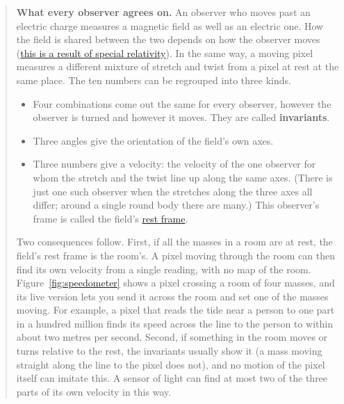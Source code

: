 \begin{quote}
\textbf{What every observer agrees on.} An observer who moves past an electric
charge measures a magnetic field as well as an electric one. How the field is
shared between the two depends on how the observer moves
(\href{https://en.wikipedia.org/wiki/Classical_electromagnetism_and_special_relativity}{this
is a result of special relativity}). In the same way, a moving pixel measures a
different mixture of stretch and twist from a pixel at rest at the same place.
The ten numbers can be regrouped into three kinds.
\begin{itemize}
\item Four combinations come out the same for every observer, however the
observer is turned and however it moves. They are called \textbf{invariants}.
\item Three angles give the orientation of the field's own axes.
\item Three numbers give a velocity: the velocity of the one observer for whom
the stretch and the twist line up along the same axes. (There is just one such
observer when the stretches along the three axes all differ; around a single
round body there are many.) This observer's frame is
called the field's
\href{https://en.wikipedia.org/wiki/Rest_frame}{rest frame}.
\end{itemize}
Two consequences follow. First, if all the masses in a room are at rest, the
field's rest frame is the room's. A pixel moving through the room can then find
its own velocity from a single reading, with no map of the room. Figure~\ref{fig:speedometer} shows a pixel crossing a room of four masses, and its live version lets you send it across the room and set one of the masses moving. For example, a
pixel that reads the tide near a person to one part in a hundred million finds
its speed across the line to the person to within about two metres per second.
Second, if something in the room moves or turns relative to the rest, the
invariants usually show it (a mass moving straight along the line to the pixel
does not), and no motion of the pixel itself can imitate this. A sensor of light can find at most two of
the three parts of its own velocity in this way.


\end{quote}
